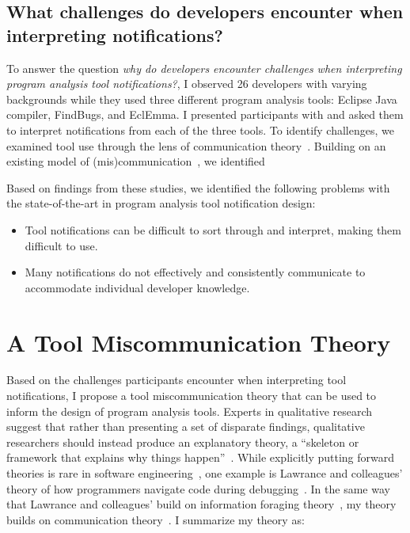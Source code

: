 \documentclass{llncs}
\begin{document}
\subsection{What challenges do developers encounter when interpreting notifications?}
To answer the question \emph{why do developers encounter challenges when interpreting program analysis tool notifications?}, I observed 26 developers with varying backgrounds while they used three different program analysis tools: Eclipse Java compiler, FindBugs, and EclEmma. I presented participants with and asked them to interpret notifications from each of the three tools. 
To identify challenges, we examined tool use through the lens of communication theory~\cite{bowman1987modeling}.
Building on an existing model of (mis)communication~\cite{mustajoki2008modelling}, we identified 




Based on findings from these studies, we identified the following problems with the state-of-the-art in program analysis tool notification design:

\begin{itemize}
	\item Tool notifications can be difficult to sort through and interpret, making them difficult to use.
	\item Many notifications do not effectively and consistently communicate to accommodate individual developer knowledge.
\end{itemize}

\section{A Tool Miscommunication Theory}\label{sec:theory}
Based on the challenges participants encounter when interpreting tool notifications, I propose a tool miscommunication theory that can be used to inform the design of program analysis tools.
Experts in qualitative research suggest that rather than presenting a set of disparate findings, qualitative researchers should instead produce an explanatory theory, a ``skeleton or framework that explains why things happen''~\cite{corbin2014basics}. While explicitly putting forward theories is rare in software engineering~\cite{hannay2007systematic}, one example is Lawrance and colleagues' theory of how programmers navigate code during debugging~\cite{lawrance2013programmers}. In the same way that Lawrance and colleagues' build on 
information foraging theory~\cite{pirolli1999information}, my theory builds on communication theory~\cite{bowman1987modeling}.
I summarize my theory as:
\end{document}
